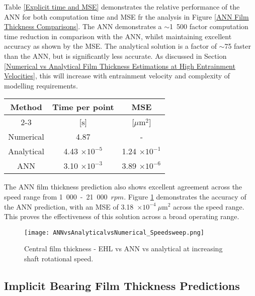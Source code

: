 Table \ref{Explicit time and MSE} demonstrates the relative performance of the ANN for both computation time and MSE fr the analysis in Figure \ref{ANN Film Thickness Comparisons}. The ANN demonstrates a $\sim$1~500 factor computation time reduction in comparison with the ANN, whilst maintaining excellent accuracy as shown by the MSE. The analytical solution is a factor of $\sim$75 faster than the ANN, but is significantly less accurate. As discussed in Section \ref{Numerical vs Analytical Film Thickness Estimations at High Entrainment Velocities}, this will increase with entrainment velocity and complexity of modelling requirements.

\begin{table*}
	\caption{Film thickness computation methodology performance relative to the numerical solution}
	\label{Explicit time and MSE}
	\centering
	\renewcommand{\arraystretch}{1.5}%
	\begin{tabular}{|c|c|c|}	
		\hline \multirow{2}{*}{\textbf{Method}} & \textbf{Time per point} & \textbf{MSE} \\
		\cline{2-3} & [$\mathrm{s}$] & [$\mu \mathrm{m}^2$] \\
		\hline Numerical & 4.87 & - \\
		\hline Analytical & 4.43 $\times 10^{-5}$ & 1.24 $\times 10^{-1}$ \\
		\hline ANN & 3.10 $\times 10^{-3}$ & 3.89 $\times 10^{-6}$ \\
		\hline
	\end{tabular}
\end{table*}

The ANN film thickness prediction also shows excellent agreement across the speed range from 1~000~-~21~000~$rpm$. Figure \ref{ANN Film Thickness Comparisons Speed Sweep} demonstrates the accuracy of the ANN prediction, with an MSE of 3.18~$\times 10^{-4}~\mu \mathrm{m}^2$ across the speed range. This proves the effectiveness of this solution across a broad operating range.

\begin{figure}
	\centering
	\texttt{[image: ANNvsAnalyticalvsNumerical\_Speedsweep.png]}
	\caption{Central film thickness - EHL vs ANN vs analytical at increasing shaft rotational speed.}
	\label{ANN Film Thickness Comparisons Speed Sweep}
\end{figure}

\subsection{Implicit Bearing Film Thickness Predictions}

